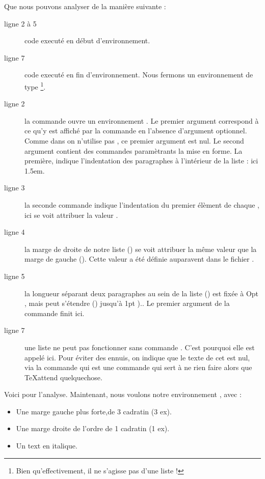 Que nous pouvons analyser de la manière suivante :
\begin{description}
\item[ligne 2 à 5]code executé en début d'environnement.
\item[ligne 7]code executé en fin d'environnement. Nous fermons un environnement de type \footnote{Bien qu'effectivement, il ne s'agisse pas d'une liste !}.
\item[ligne 2]la commande  ouvre un environnement . Le premier argument correspond à ce qu'y est affiché par la commande  en l'absence d'argument optionnel. Comme dans  on n'utilise pas , ce premier argument est nul. Le second argument contient des commandes paramètrants la mise en forme. La première,  indique l'indentation des paragraphes à l'intérieur de la liste : ici 1.5em.
\item[ligne 3]la seconde commande  indique l'indentation du premier élèment de chaque , ici  se voit attribuer la valeur .
\item[ligne 4]la marge de droite de notre liste () se voit attribuer la même valeur que la marge de gauche (). Cette valeur a été définie auparavent dans le fichier .
\item[ligne 5]la longueur séparant deux paragraphes au sein de la liste () est fixée à Opt , mais peut s'étendre () jusqu'à 1pt ).. Le premier argument de la commande  finit ici.
\item[ligne 7]une liste ne peut pas fonctionner sans commande . C'est pourquoi elle est appelé ici. Pour éviter des ennuis, on indique que le texte de cet  est nul, via la commande  qui est une commande qui sert à ne rien faire alors que \TeX attend quelquechose.
\end{description}

Voici pour l'analyse. Maintenant, nous voulons notre environnement , avec :
\begin{itemize}
\item Une marge gauche plus forte,de 3 cadratin (3 ex).
\item Une marge droite de l'ordre de 1 cadratin (1 ex). 
\item Un text en italique.
\end{itemize}

